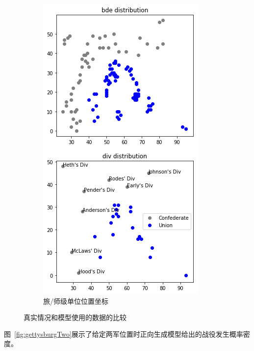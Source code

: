 \documentclass{article}
\begin{document}
\begin{figure}[ht]
\begin{subfigure}[b]{0.49\linewidth}
    \includegraphics[width=\linewidth]{gettysburg-model.png}
    \caption{旅/师级单位位置坐标}
  \end{subfigure}
  \caption{真实情况和模型使用的数据的比较}
  \label{fig:gettysburg}
\end{figure}


图~\ref{fig:gettysburgTwo}展示了给定两军位置时正向生成模型给出的战役发生概率密度。
\end{document}
